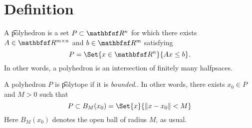 
\section*{Definition}

A \t{polyhedron} is a set $P \subset \R ^n$ for which there exists $A \in \R ^{m \times  n}$ and $b \in \R ^{m}$ satisfying
\[
P = \Set{x \in \R ^n}{Ax \leq b}.
\]
In other words, a polyhedron is an intersection of finitely many halfpsaces.

A polyhedron $P$ is \t{polytope} if it is \textit{bounded}..
In other words, there exists $x_0 \in P$ and $M > 0$ such that
\[
P \subset B_M(x_0) = \Set{x }{\norm{x - x_0} < M}
\]
Here $B_M(x_0)$ denotes the open ball of radius $M$, as usual.

\blankpage